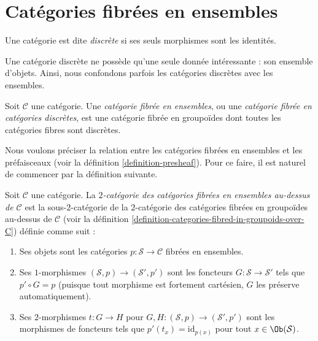\section{Catégories fibrées en ensembles}
\label{section-fibred-in-sets}

\begin{definition}
\label{definition-discrete}
Une catégorie est dite {\it discrète} si ses seuls morphismes sont les
identités.
\end{definition}

\noindent
Une catégorie discrète ne possède qu'une seule donnée intéressante :
son ensemble d'objets. Ainsi, nous confondons parfois les catégories discrètes
avec les ensembles.

\begin{definition}
\label{definition-category-fibred-sets}
Soit $\mathcal{C}$ une catégorie.
Une {\it catégorie fibrée en ensembles}, ou une {\it catégorie fibrée
en catégories discrètes}, est une catégorie fibrée en groupoïdes dont
toutes les catégories fibres sont discrètes.
\end{definition}

\noindent
Nous voulons préciser la relation entre les catégories fibrées en ensembles
et les préfaisceaux (voir la définition \ref{definition-presheaf}).
Pour ce faire, il est naturel de commencer par la définition suivante.

\begin{definition}
\label{definition-categories-fibred-in-sets-over-C}
Soit $\mathcal{C}$ une catégorie.
La {\it $2$-catégorie des catégories fibrées en ensembles au-dessus de
$\mathcal{C}$} est la sous-$2$-catégorie de la $2$-catégorie des catégories
fibrées en groupoïdes au-dessus de $\mathcal{C}$ (voir la
définition \ref{definition-categories-fibred-in-groupoids-over-C})
définie comme suit :
\begin{enumerate}
\item Ses objets sont les catégories
$p : \mathcal{S} \to \mathcal{C}$ fibrées en ensembles.
\item Ses $1$-morphismes $(\mathcal{S}, p) \to (\mathcal{S}', p')$
sont les foncteurs $G : \mathcal{S} \to \mathcal{S}'$ tels que
$p' \circ G = p$ (puisque tout morphisme est fortement cartésien,
$G$ les préserve automatiquement).
\item Ses $2$-morphismes $t : G \to H$ pour
$G, H : (\mathcal{S}, p) \to (\mathcal{S}', p')$
sont les morphismes de foncteurs
tels que $p'(t_x) = \text{id}_{p(x)}$
pour tout $x \in \Ob(\mathcal{S})$.
\end{enumerate}
\end{definition}

